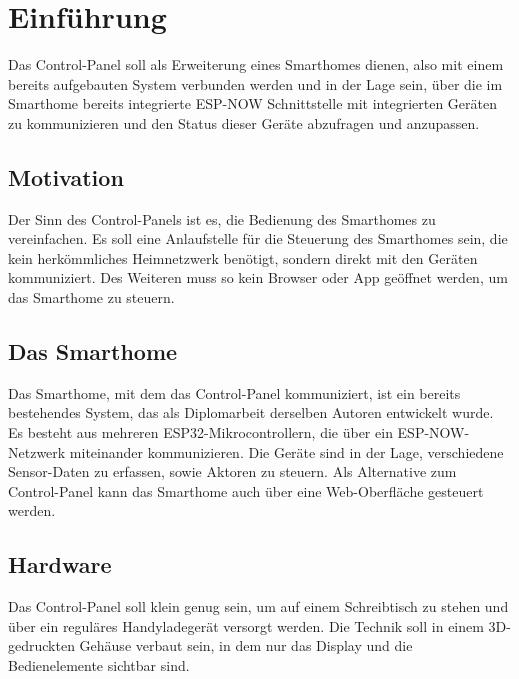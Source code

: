 \chapter{Einführung}

Das Control-Panel soll als Erweiterung eines Smarthomes dienen, also
mit einem bereits aufgebauten System verbunden werden und in der Lage sein, 
über die im Smarthome bereits integrierte ESP-NOW Schnittstelle mit 
integrierten Geräten zu kommunizieren und den Status dieser Geräte 
abzufragen und anzupassen.

    \section{Motivation}
    Der Sinn des Control-Panels ist es, die Bedienung des Smarthomes zu vereinfachen.
    Es soll eine Anlaufstelle für die Steuerung des Smarthomes sein, die kein
    herkömmliches Heimnetzwerk benötigt, sondern direkt mit den Geräten kommuniziert.
    Des Weiteren muss so kein Browser oder App geöffnet werden, um das Smarthome zu 
    steuern.

    \section{Das Smarthome}
    Das Smarthome, mit dem das Control-Panel kommuniziert, ist ein bereits 
    bestehendes System, das als Diplomarbeit derselben Autoren entwickelt wurde.
    Es besteht aus mehreren ESP32-Mikrocontrollern, die über ein ESP-NOW-Netzwerk
    miteinander kommunizieren. Die Geräte sind in der Lage, verschiedene 
    Sensor-Daten zu erfassen, sowie Aktoren zu steuern. Als Alternative zum
    Control-Panel kann das Smarthome auch über eine Web-Oberfläche gesteuert werden.

    \section{Hardware}
    Das Control-Panel soll klein genug sein, um auf einem Schreibtisch zu stehen
    und über ein reguläres Handyladegerät versorgt werden. Die Technik 
    soll in einem 3D-gedruckten Gehäuse verbaut sein, in dem nur das Display und
    die Bedienelemente sichtbar sind. 


        
        
